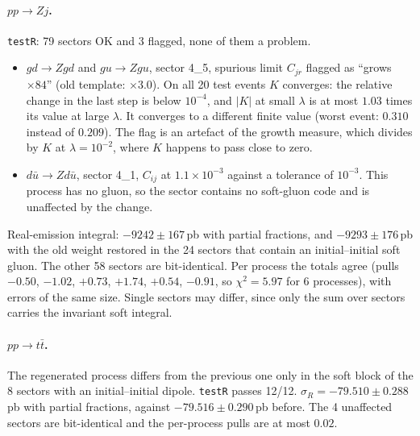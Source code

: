 \documentclass[11pt,a4paper]{article}
\begin{document}
\paragraph{$pp\to Zj$.}
\texttt{testR}: 79 sectors OK and 3 flagged, none of them a problem.
\begin{itemize}
\item $gd\to Zgd$ and $gu\to Zgu$, sector 4\_5, spurious limit $C_{jr}$
      flagged as ``grows $\times84$'' (old template: $\times3.0$). On all 20
      test events $K$ converges: the relative change in the last step is below
      $10^{-4}$, and $|K|$ at small $\lambda$ is at most $1.03$ times its
      value at large $\lambda$. It converges to a different finite value
      (worst event: $0.310$ instead of $0.209$). The flag is an artefact of the
      growth measure, which divides by $K$ at $\lambda=10^{-2}$, where $K$
      happens to pass close to zero.
\item $d\bar u\to Zd\bar u$, sector 4\_1, $C_{ij}$ at $1.1\times10^{-3}$
      against a tolerance of $10^{-3}$. This process has no gluon, so the
      sector contains no soft-gluon code and is unaffected by the change.
\end{itemize}
Real-emission integral: $-9242\pm167$\,pb with partial fractions, and
$-9293\pm176$\,pb with the old weight restored in the 24 sectors that contain
an initial--initial soft gluon. The other 58 sectors are bit-identical. Per
process the totals agree (pulls $-0.50$, $-1.02$, $+0.73$, $+1.74$, $+0.54$,
$-0.91$, so $\chi^2=5.97$ for 6 processes), with errors of the same size. Single sectors may
differ, since only the sum over sectors carries the invariant soft integral.

\paragraph{$pp\to t\bar t$.}
The regenerated process differs from the previous one only in the soft block
of the 8 sectors with an initial--initial dipole. \texttt{testR} passes 12/12.
$\sigma_R = -79.510\pm0.288$\,pb with partial fractions, against
$-79.516\pm0.290$\,pb before. The 4 unaffected sectors are bit-identical and
the per-process pulls are at most $0.02$.
\end{document}
